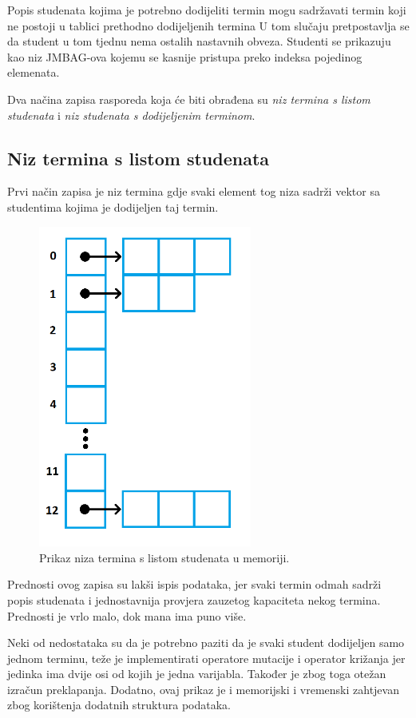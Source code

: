 \documentclass[times, utf8, zavrsni]{fer}
\begin{document}
Popis studenata kojima je potrebno dodijeliti termin mogu sadržavati termin koji ne postoji u tablici prethodno dodijeljenih termina U tom slučaju pretpostavlja se da student u tom tjednu nema ostalih nastavnih obveza. Studenti se prikazuju kao niz JMBAG-ova kojemu se kasnije pristupa preko indeksa pojedinog elemenata.

Dva načina zapisa rasporeda koja će biti obrađena su \emph{niz termina s listom studenata} i \emph{niz studenata s dodijeljenim terminom}.

\subsection{Niz termina s listom studenata}

Prvi način zapisa je niz termina gdje svaki element tog niza sadrži vektor sa studentima kojima je dodijeljen taj termin.

\begin{figure}[htb]
\centering
\includegraphics[width=7cm]{images/prikaz_jednike_1.png}
\caption{Prikaz niza termina s listom studenata u memoriji.}
\label{fig:prikaz_jednike_1}
\end{figure}

Prednosti ovog zapisa su lakši ispis podataka, jer svaki termin odmah sadrži popis studenata i jednostavnija provjera zauzetog kapaciteta nekog termina. Prednosti je vrlo malo, dok mana ima puno više.

Neki od nedostataka su da je potrebno paziti da je svaki student dodijeljen samo jednom terminu, teže je implementirati operatore mutacije i operator križanja jer jedinka ima dvije osi od kojih je jedna varijabla. Također je zbog toga otežan izračun preklapanja. Dodatno, ovaj prikaz je i memorijski i vremenski zahtjevan zbog korištenja dodatnih struktura podataka.
\end{document}

